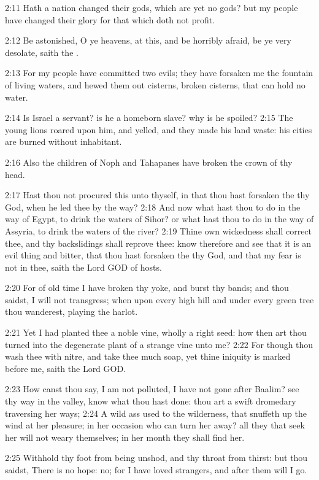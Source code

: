 2:11 Hath a nation changed their gods, which are yet no gods? but my people have changed their glory for that which doth not profit.

2:12 Be astonished, O ye heavens, at this, and be horribly afraid, be ye very desolate, saith the \LORD.

2:13 For my people have committed two evils; they have forsaken me the fountain of living waters, and hewed them out cisterns, broken cisterns, that can hold no water.

2:14 Is Israel a servant? is he a homeborn slave? why is he spoiled?  2:15 The young lions roared upon him, and yelled, and they made his land waste: his cities are burned without inhabitant.

2:16 Also the children of Noph and Tahapanes have broken the crown of thy head.

2:17 Hast thou not procured this unto thyself, in that thou hast forsaken the \LORD thy God, when he led thee by the way?  2:18 And now what hast thou to do in the way of Egypt, to drink the waters of Sihor? or what hast thou to do in the way of Assyria, to drink the waters of the river?  2:19 Thine own wickedness shall correct thee, and thy backslidings shall reprove thee: know therefore and see that it is an evil thing and bitter, that thou hast forsaken the \LORD thy God, and that my fear is not in thee, saith the Lord GOD of hosts.

2:20 For of old time I have broken thy yoke, and burst thy bands; and thou saidst, I will not transgress; when upon every high hill and under every green tree thou wanderest, playing the harlot.

2:21 Yet I had planted thee a noble vine, wholly a right seed: how then art thou turned into the degenerate plant of a strange vine unto me?  2:22 For though thou wash thee with nitre, and take thee much soap, yet thine iniquity is marked before me, saith the Lord GOD.

2:23 How canst thou say, I am not polluted, I have not gone after Baalim?  see thy way in the valley, know what thou hast done: thou art a swift dromedary traversing her ways; 2:24 A wild ass used to the wilderness, that snuffeth up the wind at her pleasure; in her occasion who can turn her away? all they that seek her will not weary themselves; in her month they shall find her.

2:25 Withhold thy foot from being unshod, and thy throat from thirst: but thou saidst, There is no hope: no; for I have loved strangers, and after them will I go.

